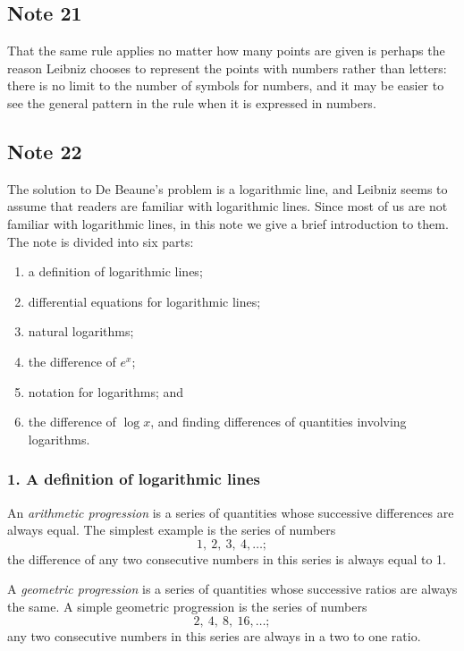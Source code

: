 \documentclass[polutonikogreek,english,twoside,openright]{article}
\begin{document}
\subsection*{Note 21}
\label{cnm21}

That the same rule applies no matter how many points are given is
perhaps the reason Leibniz chooses to represent the points with
numbers rather than letters: there is no limit to the number of
symbols for numbers, and it may be easier to see the general pattern
in the rule when it is expressed in numbers.

\subsection*{Note 22}
\label{bdebeaune}
\label{cnm22}
 
The solution to De Beaune's problem is a logarithmic line, and Leibniz
seems to assume that readers are familiar with logarithmic lines.
Since most of us are not familiar with logarithmic lines, in this note
we give a brief introduction to them.  The note is divided into six
parts:
\begin{enumerate}
\item a definition of logarithmic lines;
\item differential equations for logarithmic lines;
\item natural logarithms;
\item the difference of $e^x$;
\item notation for logarithms; and
\item the difference of $\log x$, and finding differences of quantities involving logarithms.
\end{enumerate}

\subsubsection*{1. A definition of logarithmic lines}

An {\em arithmetic progression} is a series of quantities whose
successive differences are always equal.  The simplest example is the
series of numbers
$$1,\ 2,\ 3,\ 4, \ldots;$$
the difference of any two consecutive numbers in this series is always equal to 1.

A {\em geometric progression} is a series of quantities whose
successive ratios are always the same.  A simple geometric progression
is the series of numbers
$$2,\ 4,\  8,\ 16, \ldots;$$
any two consecutive numbers in this series are always in a two to one ratio.
\end{document}
